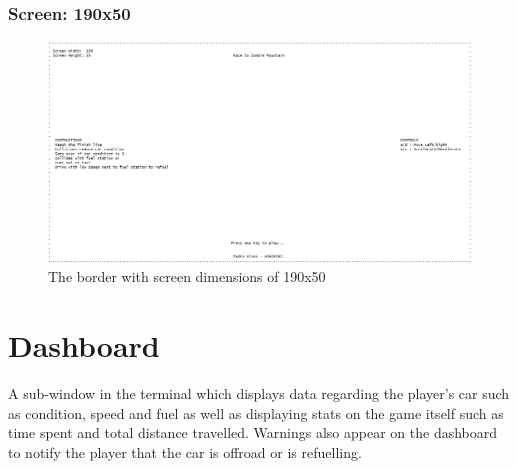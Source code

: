 \documentclass{article}
\begin{document}
\subsubsection*{Screen: 190x50}
\begin{figure}[!ht]
	\begin{center}
	\includegraphics[width=0.77\paperwidth]{images/border_190x50}
	\caption{The border with screen dimensions of 190x50}
	\label{fig:border_190x50} 
	\end{center}
\end{figure}

\clearpage
\section{Dashboard}
A sub-window in the terminal which displays data regarding the player's car such as condition, speed and fuel as well as displaying stats on the game itself such as time spent and total distance travelled. 
\newline
Warnings also appear on the dashboard to notify the player that the car is offroad or is refuelling.
\end{document}

